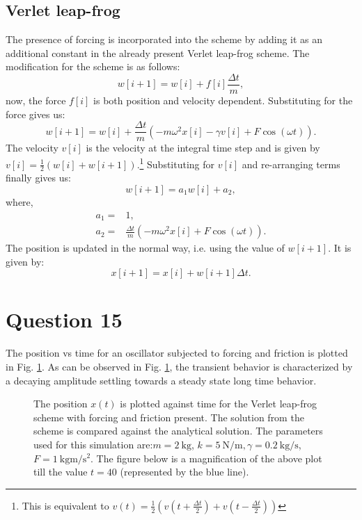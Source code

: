 \documentclass[10pt]{article}
\begin{document}
\subsection*{Verlet leap-frog}
The presence of forcing is incorporated into the scheme by adding it as an additional constant in the already present Verlet leap-frog scheme. The modification for the scheme is as follows:
%
\begin{equation*}
w[i+1] = w[i] + f[i]\frac{\Delta t}{m},
\end{equation*}
%
now, the force $f[i]$ is both position and velocity dependent. Substituting for the force gives us:
%
\begin{equation*}
w[i+1] = w[i] + \frac{\Delta t}{m}( -m\omega^2 x[i] - \gamma v[i] + F\cos(\omega t) ).
\end{equation*} 
%
The velocity $v[i]$ is the velocity at the integral time step and is given by $v[i] = \frac{1}{2} ( w[i] + w[i+1] )$.\footnote{This is equivalent to $v(t) = \frac{1}{2} ( v(t + \frac{\Delta t}{2} ) + v(t - \frac{\Delta t}{2} ) )$ } Substituting for $v[i]$ and re-arranging terms finally gives us:
%
\begin{equation}
w[i+1] = a_{1}w[i] + a_{2},
\end{equation}
%
where,
%
\begin{eqnarray}
a_{1} =& 1, \\
a_{2} =& \frac{\Delta t}{m}( -m\omega^2 x[i] + F\cos(\omega t) ).
\end{eqnarray}
%
The position is updated in the normal way, i.e. using the value of $w[i+1]$. It is given by:
\begin{equation}
x[i+1] = x[i] + w[i+1]\Delta t.
\end{equation}

\section*{Question 15}
The position vs time for an oscillator subjected to forcing and friction is plotted in Fig. \ref{fig:position_vs_time_friction_forcing}. As can be observed in Fig. \ref{fig:position_vs_time_friction_forcing}, the transient behavior is characterized by a decaying amplitude settling towards a steady state long time behavior. 

\begin{figure}[!htb]
\centering


\caption{The position $x(t)$ is plotted against time for the Verlet leap-frog scheme with forcing and friction present. The solution from the scheme is compared against the analytical solution. The parameters used for this simulation are:$m=2\ \mathrm{kg}$, $k=5\ \mathrm{N/m}, \gamma=0.2\ \mathrm{kg/s}$, $F=1\ \mathrm{kg m/s^2}$. The figure below is a magnification of the above plot till the value $t=40$ (represented by the blue line).}
\label{fig:position_vs_time_friction_forcing}
\end{figure} 
\end{document}
